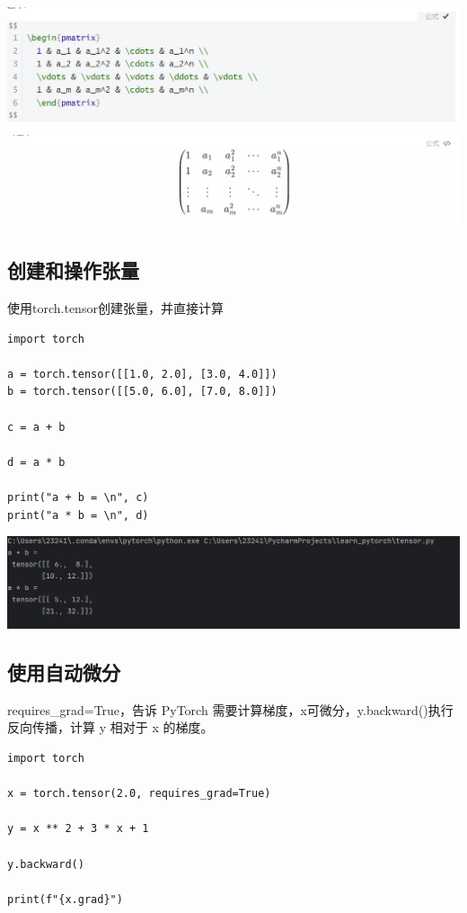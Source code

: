 \documentclass[UTF8,a4paper]{ctexart}
\begin{document}
\begin{sloppypar}
	\includegraphics[width = 16cm]{91}
	\includegraphics[width = 16cm]{92}
	
	
	\subsection{创建和操作张量}
	使用torch.tensor创建张量，并直接计算


	\begin{lstlisting}
import torch

a = torch.tensor([[1.0, 2.0], [3.0, 4.0]])
b = torch.tensor([[5.0, 6.0], [7.0, 8.0]])

c = a + b

d = a * b

print("a + b = \n", c)
print("a * b = \n", d)
	\end{lstlisting}
	
	\includegraphics[width = 16cm]{10}
	
	
	\subsection{使用自动微分}
	requires\_grad=True，告诉 PyTorch 需要计算梯度，x可微分，y.backward()执行反向传播，计算 y 相对于 x 的梯度。
	\begin{lstlisting}
import torch

x = torch.tensor(2.0, requires_grad=True)

y = x ** 2 + 3 * x + 1

y.backward()

print(f"{x.grad}")
    \end{lstlisting}
	

\end{sloppypar}
\end{document}

